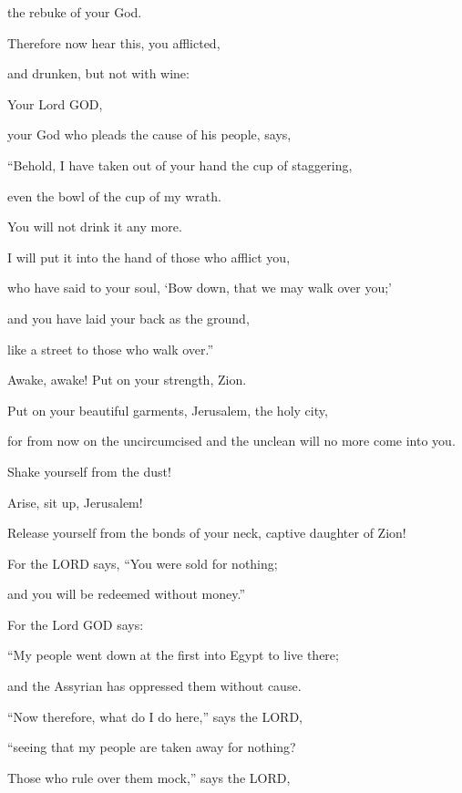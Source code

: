 the rebuke of your God.


\vspace{\baselineskip} \myverse{}Therefore now hear this, you afflicted,

and drunken, but not with wine:

\myverse{}Your Lord GOD,

your God who pleads the cause of his people, says,

“Behold, I have taken out of your hand the cup of staggering,

even the bowl of the cup of my wrath.

You will not drink it any more.

\myverse{}I will put it into the hand of those who afflict you,

who have said to your soul, ‘Bow down, that we may walk over you;’

and you have laid your back as the ground,

like a street to those who walk over.”


\mychapter{} \myverse*{}Awake, awake! Put on your strength, Zion.

\quad\quad Put on your beautiful garments, Jerusalem, the holy city,

for from now on the uncircumcised and the unclean will no more come into you.

\myverse{}Shake yourself from the dust!

Arise, sit up, Jerusalem!

Release yourself from the bonds of your neck, captive daughter of Zion!


\vspace{\baselineskip} \myverse{}For the LORD says, “You were sold for nothing;

and you will be redeemed without money.”


\vspace{\baselineskip} \myverse{}For the Lord GOD says:

“My people went down at the first into Egypt to live there;

and the Assyrian has oppressed them without cause.


\vspace{\baselineskip} \myverse{}“Now therefore, what do I do here,” says the LORD,

“seeing that my people are taken away for nothing?

Those who rule over them mock,” says the LORD,

